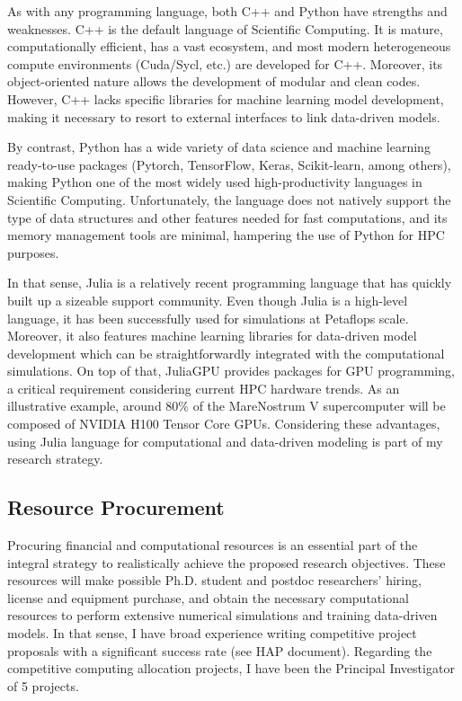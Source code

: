 \documentclass{article}
\begin{document}
As with any programming language, both C++ and Python have strengths and weaknesses. C++ is the default language of Scientific Computing. It is mature, computationally efficient, has a vast ecosystem, and most modern heterogeneous compute environments (Cuda/Sycl, etc.) are developed for C++. Moreover, its object-oriented nature allows the development of modular and clean codes. However, C++ lacks specific libraries for machine learning model development, making it necessary to resort to external interfaces to link data-driven models. 

By contrast, Python has a wide variety of data science and machine learning ready-to-use packages (Pytorch, TensorFlow, Keras, Scikit-learn, among others), making Python one of the most widely used high-productivity languages in Scientific Computing. Unfortunately, the language does not natively support the type of data structures and other features needed for fast computations, and its memory management tools are minimal, hampering the use of Python for HPC purposes.

In that sense, Julia is a relatively recent programming language that has quickly built up a sizeable support community. Even though Julia is a high-level language, it has been successfully used for simulations at Petaflops scale. Moreover, it also features machine learning libraries for data-driven model development which can be straightforwardly integrated with the computational simulations. On top of that, JuliaGPU provides packages for GPU programming, a critical requirement considering current HPC hardware trends. As an illustrative example, around 80\% of the MareNostrum V supercomputer will be composed of NVIDIA H100 Tensor Core GPUs.  
Considering these advantages, using Julia language for computational and data-driven modeling is part of my research strategy.


\subsection{Resource Procurement} \label{sec:resources}

Procuring financial and computational resources is an essential part of the integral strategy to realistically achieve the proposed research objectives. These resources will make possible Ph.D. student and postdoc researchers' hiring, license and equipment purchase, and obtain the necessary computational resources to perform extensive numerical simulations and training data-driven models. In that sense, I have broad experience writing competitive project proposals with a significant success rate (see HAP document). Regarding the competitive computing allocation projects, I have been the Principal Investigator of 5 projects. 
\end{document}
